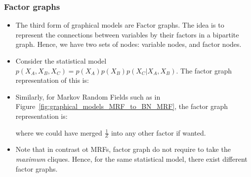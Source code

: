 \subsubsection{Factor graphs}
\begin{itemize}
	\item The third form of graphical models are Factor graphs. The idea is to represent the connections between variables by their factors in a bipartite graph. Hence, we have two sets of nodes: variable nodes, and factor nodes.
	\item Consider the statistical model $p(X_A,X_B,X_C)=p(X_A)p(X_B)p(X_C|X_A,X_B)$. The factor graph representation of this is:
	\begin{figure}[ht!]
		\centering
	\end{figure}
	\item Similarly, for Markov Random Fields such as in Figure~\ref{fig:graphical_models_MRF_to_BN_MRF}, the factor graph representation is:
	
	
	\begin{figure}[ht!]
		\centering
	\end{figure}
	
	where we could have merged $\frac{1}{Z}$ into any other factor if wanted.
	\item Note that in contrast ot MRFs, factor graph do not require to take the \textit{maximum} cliques. Hence, for the same statistical model, there exist different factor graphs.
\end{itemize}
